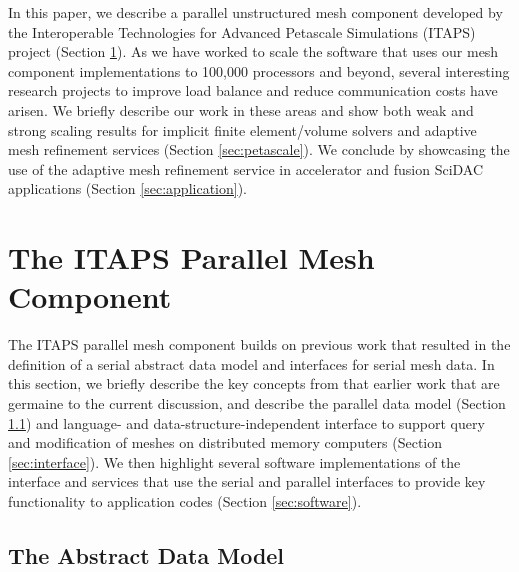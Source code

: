 \documentclass[letterpaper]{jpconf}
\begin{document}
In this paper, we describe a parallel unstructured mesh component
developed by the Interoperable Technologies for Advanced Petascale
Simulations (ITAPS) project (Section \ref{sec:component}).  As we have
worked to scale the software that uses our mesh component
implementations to 100,000 processors and beyond, several interesting
research projects to improve load balance and reduce communication
costs have arisen.  We briefly describe our work in these areas and
show both weak and strong scaling results for implicit finite
element/volume solvers and adaptive mesh refinement services (Section
\ref{sec:petascale}).  We conclude by showcasing the use of the
adaptive mesh refinement service in accelerator and fusion SciDAC
applications (Section \ref{sec:application}).

\section{The ITAPS Parallel Mesh Component}
\label{sec:component}

The ITAPS parallel mesh component builds on previous work that
resulted in the definition of a serial abstract data model and
interfaces for serial mesh data.  In this section, we briefly describe the
key concepts from that earlier work that are germaine to the current
discussion, and describe the parallel data model (Section
\ref{sec:data_model}) and language- and data-structure-independent
interface to support query and modification of meshes on distributed
memory computers (Section \ref{sec:interface}).  We then highlight
several software implementations of the interface and services that
use the serial and parallel interfaces to provide key functionality to
application codes (Section \ref{sec:software}).
 
\subsection{The Abstract Data Model}
\label{sec:data_model}
\end{document}
